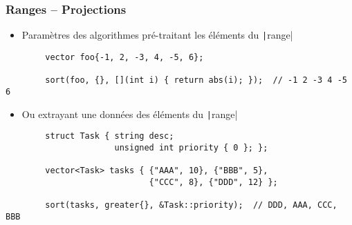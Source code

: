 \documentclass[C++.tex]{subfiles}
\begin{document}
\begin{frame}[fragile]
	\frametitle{Ranges -- Projections}
	\begin{itemize}
		\item Paramètres des algorithmes pré-traitant les éléments du \texttt|range|
	\end{itemize}

	\begin{verbatim}
		vector foo{-1, 2, -3, 4, -5, 6};

		sort(foo, {}, [](int i) { return abs(i); });  // -1 2 -3 4 -5 6
	\end{verbatim}


	\begin{itemize}
		\item Ou extrayant une données des éléments du \texttt|range|
	\end{itemize}

	\begin{verbatim}
		struct Task { string desc;
		              unsigned int priority { 0 }; };

		vector<Task> tasks { {"AAA", 10}, {"BBB", 5},
		                     {"CCC", 8}, {"DDD", 12} };

		sort(tasks, greater{}, &Task::priority);  // DDD, AAA, CCC, BBB
	\end{verbatim}
\end{frame}
\end{document}
